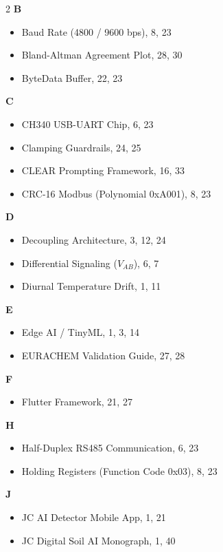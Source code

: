 \begin{multicols}{2}
\textbf{B}
\begin{itemize}[leftmargin=1.5em, itemsep=1pt]
    \item Baud Rate (4800 / 9600 bps), 8, 23
    \item Bland-Altman Agreement Plot, 28, 30
    \item ByteData Buffer, 22, 23
\end{itemize}

\textbf{C}
\begin{itemize}[leftmargin=1.5em, itemsep=1pt]
    \item CH340 USB-UART Chip, 6, 23
    \item Clamping Guardrails, 24, 25
    \item CLEAR Prompting Framework, 16, 33
    \item CRC-16 Modbus (Polynomial 0xA001), 8, 23
\end{itemize}

\textbf{D}
\begin{itemize}[leftmargin=1.5em, itemsep=1pt]
    \item Decoupling Architecture, 3, 12, 24
    \item Differential Signaling ($V_{AB}$), 6, 7
    \item Diurnal Temperature Drift, 1, 11
\end{itemize}

\textbf{E}
\begin{itemize}[leftmargin=1.5em, itemsep=1pt]
    \item Edge AI / TinyML, 1, 3, 14
    \item EURACHEM Validation Guide, 27, 28
\end{itemize}

\textbf{F}
\begin{itemize}[leftmargin=1.5em, itemsep=1pt]
    \item Flutter Framework, 21, 27
\end{itemize}

\textbf{H}
\begin{itemize}[leftmargin=1.5em, itemsep=1pt]
    \item Half-Duplex RS485 Communication, 6, 23
    \item Holding Registers (Function Code 0x03), 8, 23
\end{itemize}

\textbf{J}
\begin{itemize}[leftmargin=1.5em, itemsep=1pt]
    \item JC AI Detector Mobile App, 1, 21
    \item JC Digital Soil AI Monograph, 1, 40
\end{itemize}


\end{multicols}
